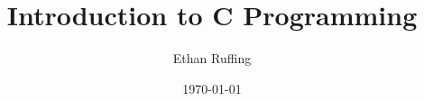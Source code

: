 
\title{Introduction to C Programming}
\date{\today}
\author{Ethan Ruffing}

\def\copyrightpage{
	\clearpage\null
	\vspace*{.15\textheight}
	\pagestyle{empty}
	\begin{minipage}[b]{0.9\textwidth}
	\footnotesize\raggedright
	\setlength{\parskip}{0.5\baselineskip}
	Copyright \copyright \the\year\ by Ethan Ruffing. All Rights Reserved. 
	\end{minipage}
	\vspace*{2\baselineskip}
	\cleardoublepage
}
